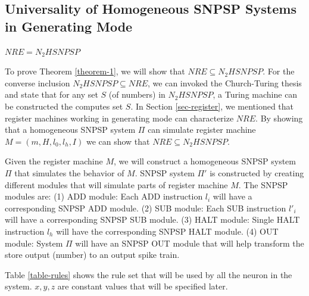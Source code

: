 \documentclass[runningheads,a4paper]{llncs}
\begin{document}

\subsection{Universality of Homogeneous SNPSP Systems in Generating Mode}\label{sec-gen-mode}

\begin{theorem}\label{theorem-1}
$NRE = N_2HSNPSP$ 
\end{theorem}

\proof To prove Theorem \ref{theorem-1}, we will show that $NRE \subseteq N_2HSNPSP$. For the converse inclusion $N_2HSNPSP \subseteq NRE$, we can
invoked the Church-Turing thesis and state that for any set $S$ (of numbers) in $N_2HSNPSP$, a Turing machine can be constructed the computes set $S$. 
In Section \ref{sec-register}, we mentioned that register machines  working in generating mode can characterize $NRE$. By showing that a homogeneous
SNPSP system $\Pi$ can simulate register machine $M=(m, H, l_0, l_h, I)$ we can show that $NRE \subseteq N_2HSNPSP$.

Given the register machine $M$, we will construct a homogeneous SNPSP system $\Pi$ that simulates the behavior of $M$. SNPSP system $\Pi'$ 
is constructed by creating different modules that will simulate parts of register machine $M$. The SNPSP modules are:
(1)  ADD module: Each ADD instruction $l_i$ will have a corresponding SNPSP ADD module.
(2)  SUB module: Each SUB instruction $l'_i$ will have a corresponding SNPSP SUB module. 
(3)  HALT module: Single HALT instruction $l_h$ will have the corresponding SNPSP HALT module.
(4)  OUT module: System $\Pi$ will have an SNPSP OUT module that will help transform the store output (number) to an output spike train.


Table \ref{table-rules} shows the rule set that will be used by all the neuron in the system. $x,y,z$ are constant values that will be specified
later.
\end{document}
